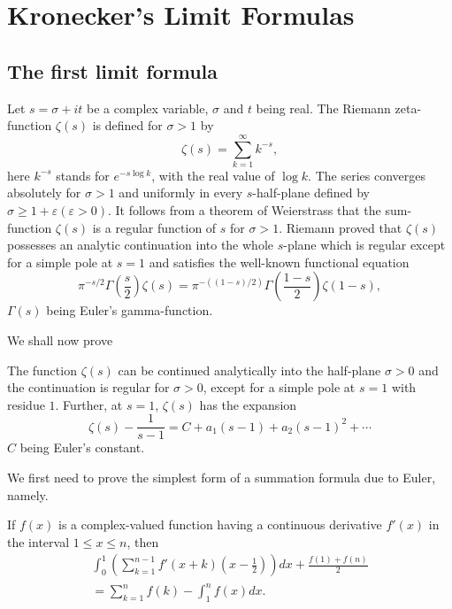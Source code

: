 
\chapter{Kronecker's Limit Formulas}\label{chap1}

\section{The first limit formula}\label{chap1:sec1}\pageoriginale

Let $s=\sigma + it$ be a complex variable, $\sigma$ and $t$ being
real. The Riemann zeta-function $\zeta(s)$ is defined for $\sigma>1$
by
$$
\zeta(s)=\sum^{\infty}_{k=1}k^{-s},
$$
here $k^{-s}$ stands for $e^{-s\log k}$, with the real value of $\log
k$. The series converges absolutely for $\sigma>1$ and uniformly in
every $s$-half-plane defined by $\sigma\geq
1+\varepsilon(\varepsilon>0)$. It follows from a theorem of Weierstrass that
the sum-function $\zeta(s)$ is a regular function of $s$ for
$\sigma>1$. Riemann proved that $\zeta(s)$ possesses an analytic
continuation into the whole $s$-plane which is regular except for a
simple pole at $s=1$ and satisfies the well-known functional equation
$$
\pi^{-s/2}\Gamma\left(\frac{s}{2}\right)\zeta(s)=\pi^{-((1-s)/2)}\Gamma\left(\frac{1-s}{2}\right)\zeta(1-s), 
$$
$\Gamma(s)$ being Euler's gamma-function.

We shall now prove

\begin{proposition}\label{prop1}
The function $\zeta(s)$ can be continued analytically into the
half-plane $\sigma>0$ and the continuation is regular for $\sigma>0$,
except for a simple pole at $s=1$ with residue $1$. Further, at $s=1$,
$\zeta(s)$ has the expansion
$$
\zeta(s)-\frac{1}{s-1}=C+a_{1}(s-1)+a_{2}(s-1)^{2}+\cdots
$$
$C$ being Euler's constant.
\end{proposition}

We first need to prove the simplest form of a summation formula due to
Euler, namely.

\begin{lemma*}
If $f(x)$ is a complex-valued function having a continuous deri\-vative
$f'(x)$ in the interval $1\leq x\leq n$, then 
\begin{gather*}
\int^{1}_{0}\left(\sum^{n-1}_{k=1}f'(x+k)\left(x-\frac{1}{2}\right)\right)dx+\frac{f(1)+f(n)}{2}\\ 
=\sum^{n}_{k=1}f(k)-\int^{n}_{1}f(x)dx.\tag{1}\label{1}
\end{gather*}\pageoriginale
\end{lemma*}

